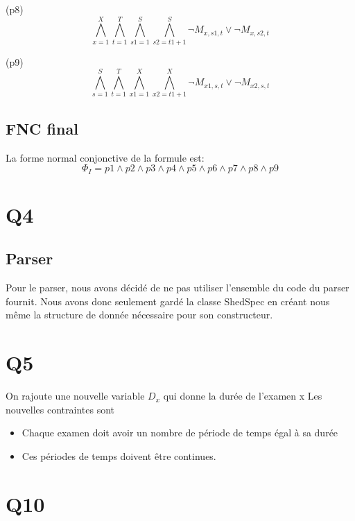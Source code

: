\documentclass[a4paper,11pt]{article}
\begin{document}
(p8)
\begin{displaymath}
\bigwedge\limits_{x=1}^{X}\bigwedge\limits_{t=1}^{T}\bigwedge\limits_{s1=1}^{S}\bigwedge\limits_{s2=t1+1}^{S} \neg M_{x, s1, t} \vee \neg M_{x, s2, t}
\end{displaymath}

(p9)
\begin{displaymath}
\bigwedge\limits_{s=1}^{S}\bigwedge\limits_{t=1}^{T}\bigwedge\limits_{x1=1}^{X}\bigwedge\limits_{x2=t1+1}^{X} \neg M_{x1, s, t} \vee \neg M_{x2, s, t}
\end{displaymath}


\subsection{FNC final}
La forme normal conjonctive de la formule est:
\begin{displaymath}
\Phi_{I} = p1 \wedge p2 \wedge p3 \wedge p4 \wedge p5 \wedge p6 \wedge p7 \wedge p8 \wedge p9
\end{displaymath}

\section{Q4}

\subsection{Parser}
Pour le parser, nous avons décidé de ne pas utiliser l'ensemble du code du parser fournit. Nous avons donc seulement gardé la classe ShedSpec en créant nous même la structure de donnée nécessaire pour son constructeur.

\section{Q5}
On rajoute une nouvelle variable \( D_{x}\) qui donne la durée de l'examen x
Les nouvelles contraintes sont 
\begin{itemize}
	\item Chaque examen doit avoir un nombre de période de temps égal à sa durée
  \item Ces périodes de temps doivent être continues.
\end{itemize}



\section{Q10}
\end{document}
